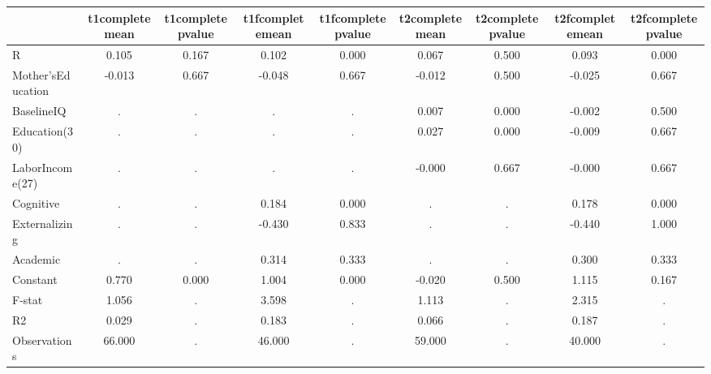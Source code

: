 \begin{table}[htbp]
\begin{tabular}{lcccccccc} \hline \hline
 & t1completemean  & t1completepvalue  & t1fcompletemean  & t1fcompletepvalue  & t2completemean  & t2completepvalue  & t2fcompletemean  & t2fcompletepvalue  \\  \hline 
R &     0.105 &     0.167 &     0.102 &     0.000 &     0.067 &     0.500 &     0.093 &     0.000 \\  
Mother'sEducation &    -0.013 &     0.667 &    -0.048 &     0.667 &    -0.012 &     0.500 &    -0.025 &     0.667 \\  
BaselineIQ &         . &         . &         . &         . &     0.007 &     0.000 &    -0.002 &     0.500 \\  
Education(30) &         . &         . &         . &         . &     0.027 &     0.000 &    -0.009 &     0.667 \\  
LaborIncome(27) &         . &         . &         . &         . &    -0.000 &     0.667 &    -0.000 &     0.667 \\  
Cognitive &         . &         . &     0.184 &     0.000 &         . &         . &     0.178 &     0.000 \\  
Externalizing &         . &         . &    -0.430 &     0.833 &         . &         . &    -0.440 &     1.000 \\  
Academic &         . &         . &     0.314 &     0.333 &         . &         . &     0.300 &     0.333 \\  
Constant &     0.770 &     0.000 &     1.004 &     0.000 &    -0.020 &     0.500 &     1.115 &     0.167 \\  
F-stat &     1.056 &         . &     3.598 &         . &     1.113 &         . &     2.315 &         . \\  
R2 &     0.029 &         . &     0.183 &         . &     0.066 &         . &     0.187 &         . \\  
Observations &    66.000 &         . &    46.000 &         . &    59.000 &         . &    40.000 &         . \\  
\hline \hline \end{tabular}
\end{table}
